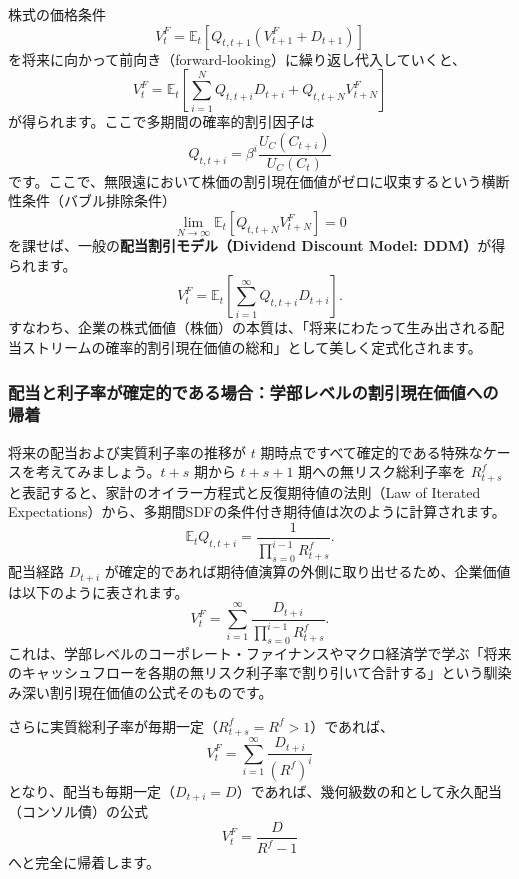 \documentclass[
  japanese,
  lualatex,
  ja=standard,
  12pt,
  a4paper]{ltjsarticle}
\begin{document}
株式の価格条件 \[
V_t^F = \mathbb{E}_t \left[ Q_{t,t+1} (V_{t+1}^F + D_{t+1}) \right]
\] を将来に向かって前向き（forward-looking）に繰り返し代入していくと、
\[
V_t^F = \mathbb{E}_t \left[ \sum_{i=1}^{N} Q_{t,t+i} D_{t+i} + Q_{t,t+N} V_{t+N}^F \right]
\] が得られます。ここで多期間の確率的割引因子は \[
Q_{t,t+i} = \beta^i \frac{U_C(C_{t+i})}{U_C(C_t)}
\]
です。ここで、無限遠において株価の割引現在価値がゼロに収束するという横断性条件（バブル排除条件）
\[
\lim_{N\to\infty} \mathbb{E}_t \left[ Q_{t,t+N} V_{t+N}^F \right] = 0
\] を課せば、一般の\textbf{配当割引モデル（Dividend Discount Model:
DDM）}が得られます。 \[
V_t^F = \mathbb{E}_t \left[ \sum_{i=1}^{\infty} Q_{t,t+i} D_{t+i} \right].
\]
すなわち、企業の株式価値（株価）の本質は、「将来にわたって生み出される配当ストリームの確率的割引現在価値の総和」として美しく定式化されます。

\subsubsection{配当と利子率が確定的である場合：学部レベルの割引現在価値への帰着}\label{ux914dux5f53ux3068ux5229ux5b50ux7387ux304cux78baux5b9aux7684ux3067ux3042ux308bux5834ux5408ux5b66ux90e8ux30ecux30d9ux30ebux306eux5272ux5f15ux73feux5728ux4fa1ux5024ux3078ux306eux5e30ux7740}

将来の配当および実質利子率の推移が \(t\)
期時点ですべて確定的である特殊なケースを考えてみましょう。\(t+s\) 期から
\(t+s+1\) 期への無リスク総利子率を \(R_{t+s}^f\)
と表記すると、家計のオイラー方程式と反復期待値の法則（Law of Iterated
Expectations）から、多期間SDFの条件付き期待値は次のように計算されます。
\[
\mathbb{E}_t Q_{t,t+i} = \frac{1}{\displaystyle\prod_{s=0}^{i-1} R_{t+s}^f}.
\] 配当経路 \(D_{t+i}\)
が確定的であれば期待値演算の外側に取り出せるため、企業価値は以下のように表されます。
\[
V_t^F = \sum_{i=1}^{\infty} \frac{D_{t+i}}{\displaystyle\prod_{s=0}^{i-1} R_{t+s}^f}.
\]
これは、学部レベルのコーポレート・ファイナンスやマクロ経済学で学ぶ「将来のキャッシュフローを各期の無リスク利子率で割り引いて合計する」という馴染み深い割引現在価値の公式そのものです。

さらに実質総利子率が毎期一定（\(R_{t+s}^f = R^f > 1\)）であれば、 \[
V_t^F = \sum_{i=1}^{\infty} \frac{D_{t+i}}{(R^f)^i}
\]
となり、配当も毎期一定（\(D_{t+i} = D\)）であれば、幾何級数の和として永久配当（コンソル債）の公式
\[
V_t^F = \frac{D}{R^f - 1}
\] へと完全に帰着します。
\end{document}
